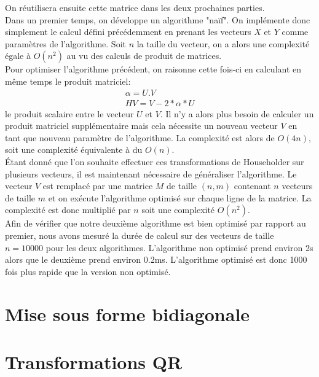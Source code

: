 \documentclass{article}
\begin{document}
On réutilisera ensuite cette matrice dans les deux prochaines parties. \\

Dans un premier temps, on développe un algorithme "naïf". On implémente donc simplement le calcul défini précédemment en prenant les vecteurs $X$ et $Y$ comme paramètres de l'algorithme.  
Soit $n$ la taille du vecteur, on a alors une complexité égale à ${O(n^2)}$ au vu des calculs de produit de matrices. \\

Pour optimiser l'algorithme précédent, on raisonne cette fois-ci en calculant en même temps le produit matriciel: 
\begin{equation}
\begin{split}
\alpha=U.V\\
HV = V - 2*\alpha*U 
\end{split}
\end{equation}
le produit scalaire entre le vecteur $U$ et $V$.
Il n'y a alors plus besoin de calculer un produit matriciel supplémentaire mais cela nécessite un nouveau vecteur $V$ en tant que nouveau paramètre de l'algorithme. 
La complexité est alors de ${O(4n)}$, soit une complexité équivalente à du ${O(n)}$. \\

Étant donné que l'on souhaite effectuer ces transformations de Householder sur plusieurs vecteurs, il est maintenant nécessaire de généraliser l'algorithme. 
Le vecteur $V$ est remplacé par une matrice $M$ de taille $(n, m)$ contenant $n$ vecteurs de taille $m$ et on exécute l'algorithme optimisé sur chaque ligne de la matrice. 
La complexité est donc multiplié par $n$ soit une complexité ${O(n^2)}$. \\

Afin de vérifier que notre deuxième algorithme est bien optimisé par rapport au premier, nous avons mesuré la durée de calcul sur des vecteurs de taille $n=10000$ pour les deux algorithmes.
L'algorithme non optimisé prend environ 2s alors que le deuxième prend environ 0.2ms. L'algorithme optimisé est donc 1000 fois plus rapide que la version non optimisé.
   
\section{Mise sous forme bidiagonale} 
   
\section{Transformations QR}
\end{document}
